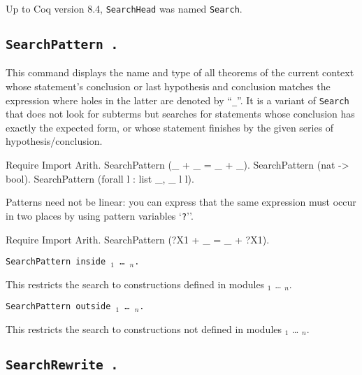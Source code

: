 \Warning Up to Coq version 8.4, {\tt SearchHead} was named {\tt Search}.

\subsection[\tt SearchPattern {\termpattern}.]{\tt SearchPattern {\term}.}

This command displays the name and type of all theorems of the current
context whose statement's conclusion or last hypothesis and conclusion
matches the expression {\term} where holes in the latter are denoted
by ``{\texttt \_}''. It is a variant of {\tt Search
  {\termpattern}} that does not look for subterms but searches for
statements whose conclusion has exactly the expected form, or whose
statement finishes by the given series of hypothesis/conclusion.

\begin{coq_example}
Require Import Arith.
SearchPattern (_ + _ = _ + _).
SearchPattern (nat -> bool).
SearchPattern (forall l : list _, _ l l).
\end{coq_example}

Patterns need not be linear: you can express that the same expression
must occur in two places by using pattern variables `{\texttt
?{\ident}}''.

\begin{coq_example}
Require Import Arith.
SearchPattern (?X1 + _ = _ + ?X1).
\end{coq_example}

\begin{Variants}
\item {\tt SearchPattern {\term} inside
{\module$_1$} \ldots{} {\module$_n$}.}

This restricts the search to constructions defined in modules
{\module$_1$} \ldots{} {\module$_n$}.

\item {\tt SearchPattern {\term} outside {\module$_1$} \ldots{} {\module$_n$}.}

This restricts the search to constructions not defined in modules
{\module$_1$} \ldots{} {\module$_n$}.

\end{Variants}

\subsection[\tt SearchRewrite {\term}.]{\tt SearchRewrite {\term}.}

